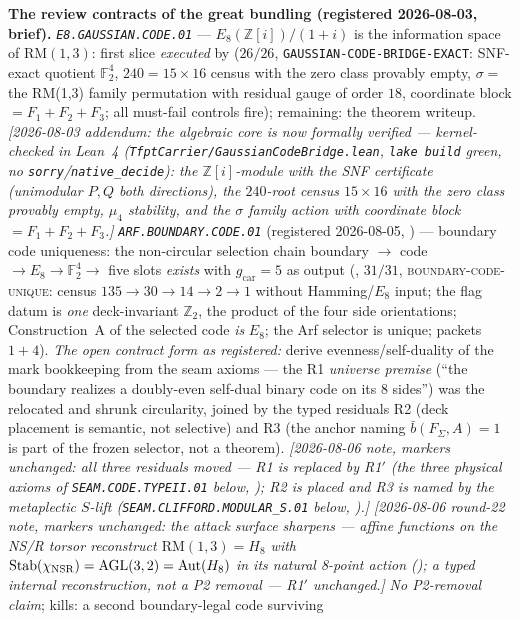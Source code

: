 \documentclass[11pt,a4paper]{article}
\newcommand{\gcar}{g_{\mathrm{car}}}
\newcommand{\Z}{\mathbb Z}
\begin{document}
\par\smallskip\noindent\textbf{The review contracts of the great
bundling (registered 2026-08-03, brief).}
\emph{\texttt{E8.GAUSSIAN.CODE.01}} --- $E_8(\mathbb{Z}[i])/(1+i)$ is
the information space of $\mathrm{RM}(1,3)$: first slice
\emph{executed} by  ($26/26$,
\texttt{GAUSSIAN-CODE-BRIDGE-EXACT}: SNF-exact quotient
$\mathbb{F}_2^4$, $240=15\times16$ census with the zero class
provably empty, $\sigma=$ the RM(1,3) family permutation with
residual gauge of order $18$, coordinate block $=F_1{+}F_2{+}F_3$;
all must-fail controls fire); remaining: the theorem writeup.
\emph{[2026-08-03 addendum: the algebraic core is now formally
verified --- kernel-checked in Lean~4
(\texttt{TfptCarrier/GaussianCodeBridge.lean}, \texttt{lake build}
green, no \texttt{sorry}/\texttt{native\_decide}): the
$\mathbb{Z}[i]$-module with the SNF certificate (unimodular $P,Q$
both directions), the $240$-root census $15\times16$ with the zero
class provably empty, $\mu_4$ stability, and the $\sigma$ family
action with coordinate block $=F_1{+}F_2{+}F_3$.]}
\emph{\texttt{ARF.BOUNDARY.CODE.01}} (registered 2026-08-05, \mO)
--- boundary code uniqueness: the non-circular selection chain
boundary $\to$ code $\to E_8\to\mathbb F_2^4\to$ five slots
\emph{exists} with $\gcar=5$ as output
(, $31/31$,
\textsc{boundary-code-unique}: census $135\to30\to14\to2\to1$
without Hamming/$E_8$ input; the flag datum is \emph{one}
deck-invariant $\Z_2$, the product of the four side orientations;
Construction~A of the selected code \emph{is} $E_8$; the Arf
selector is unique; packets $1+4$).  \emph{The open contract form
as registered:} derive evenness/self-duality of the mark
bookkeeping from the seam axioms --- the R1 \emph{universe premise}
(``the boundary realizes a doubly-even self-dual binary code on
its 8 sides'') was the relocated and shrunk circularity, joined by
the typed residuals R2 (deck placement is semantic, not selective)
and R3 (the anchor naming $\bar b(F_\Sigma,A)=1$ is part of the
frozen selector, not a theorem).  \emph{[2026-08-06 note, markers
unchanged: all three residuals moved --- R1 is replaced by R1$'$
(the three physical axioms of \texttt{SEAM.CODE.TYPEII.01} below,
); R2 is placed and R3 is named
by the metaplectic $S$-lift
(\texttt{SEAM.CLIFFORD.MODULAR\_S.01} below,
).]}  \emph{[2026-08-06
round-22 note, markers unchanged: the attack surface sharpens ---
affine functions on the NS/R torsor reconstruct
$\mathrm{RM}(1,3)=H_8$ with
$\mathrm{Stab}(\chi_{\rm NSR})=\mathrm{AGL}(3,2)=\mathrm{Aut}(H_8)$
in its natural 8-point action
(); a typed internal
reconstruction, not a P2 removal --- R1$'$ unchanged.]}  \emph{No
P2-removal claim}; kills: a second boundary-legal code surviving
\end{document}
